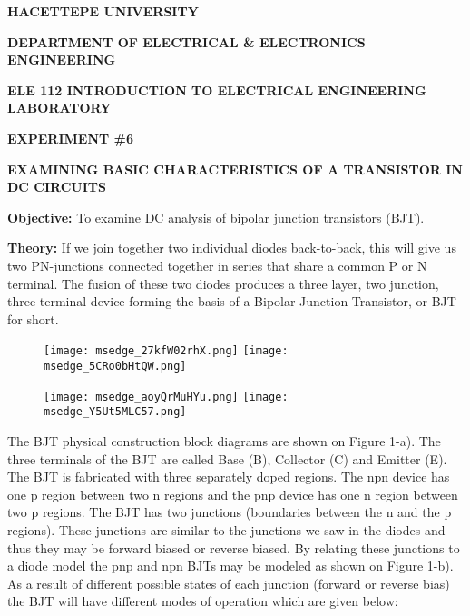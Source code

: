 \documentclass{article}
\begin{document}
\large

{\small \textbf{HACETTEPE UNIVERSITY}}

{\small \textbf{DEPARTMENT OF ELECTRICAL \& ELECTRONICS ENGINEERING}} 

{\small \textbf{ELE 112 INTRODUCTION TO ELECTRICAL ENGINEERING LABORATORY}} 

\vspace{4mm}

{\small \textbf{EXPERIMENT \#6}}

\vspace{4mm}

{\small \textbf{EXAMINING BASIC CHARACTERISTICS OF A TRANSISTOR IN DC CIRCUITS}}

\vspace{4mm}

{\textbf{Objective:}}
{To examine DC analysis of bipolar junction transistors (BJT).}

\vspace{4mm}

{\textbf{Theory:} If we join together two individual diodes back-to-back, this will give us two PN-junctions connected together in series that share a common P or N terminal. The fusion of these two diodes produces a three layer, two junction, three terminal device forming the basis of a Bipolar Junction Transistor, or BJT for short.}

\begin{figure}[H]
    \centering
    \texttt{[image: msedge\_27kfW02rhX.png]}
    \texttt{[image: msedge\_5CRo0bHtQW.png]}
\end{figure}
\begin{figure}[H]
    \centering
    \texttt{[image: msedge\_aoyQrMuHYu.png]}
    \texttt{[image: msedge\_Y5Ut5MLC57.png]}
\end{figure}

{The BJT physical construction block diagrams are shown on Figure 1-a). The three terminals of the BJT are called Base (B), Collector (C) and Emitter (E). The BJT is fabricated with three separately doped regions. The npn device has one p region between two n regions and the pnp device has one n region between two p regions. The BJT has two junctions (boundaries between the n and the p regions). These junctions are similar to the junctions we saw in the diodes and thus they may be forward biased or reverse biased. By relating these junctions to a diode model the pnp and npn BJTs may be modeled as shown on Figure 1-b). As a result of different possible states of each junction (forward or reverse bias) the BJT will have different modes of operation which are given below:}
\end{document}
